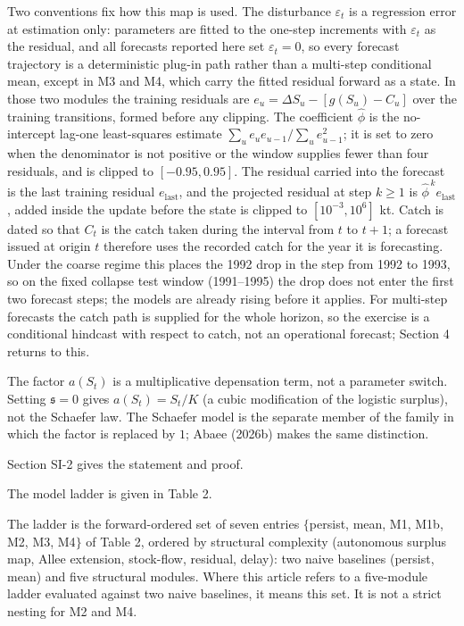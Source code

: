\documentclass[11pt]{article}
\begin{document}
Two conventions fix how this map is used. The disturbance
\(\varepsilon_t\) is a regression error at estimation only: parameters
are fitted to the one-step increments with \(\varepsilon_t\) as the
residual, and all forecasts reported here set \(\varepsilon_t = 0\), so
every forecast trajectory is a deterministic plug-in path rather than a
multi-step conditional mean, except in M3 and M4, which carry the
fitted residual forward as a state. In those two modules the training residuals are
\(e_u = \Delta S_u - [g(S_u) - C_u]\) over the training transitions,
formed before any clipping. The coefficient \(\hat\phi\) is the
no-intercept lag-one least-squares estimate
\(\sum_u e_u e_{u-1}/\sum_u e_{u-1}^2\); it is set to zero when the
denominator is not positive or the window supplies fewer than four
residuals, and is clipped to \([-0.95, 0.95]\). The residual carried
into the forecast is the last training residual \(e_{\mathrm{last}}\),
and the projected residual at step \(k \ge 1\) is
\(\hat\phi^{\,k} e_{\mathrm{last}}\), added inside the update before
the state is clipped to \([10^{-3}, 10^{6}]\) kt.
Catch is dated so that \(C_t\) is the catch taken during the interval
from \(t\) to \(t+1\); a forecast issued at origin \(t\) therefore
uses the recorded catch for the year it is forecasting. Under the
coarse regime this places the 1992 drop in the step from 1992 to 1993,
so on the fixed collapse test window (1991--1995) the drop does not
enter the first two forecast steps; the models are already rising before
it applies.
For multi-step forecasts the catch path is supplied for the
whole horizon, so the exercise is a conditional hindcast with respect to
catch, not an operational forecast; Section 4 returns to this.

The factor \(a(S_t)\) is a multiplicative depensation term, not a
parameter switch. Setting \(\mathfrak s=0\) gives \(a(S_t)=S_t/K\) (a
cubic modification of the logistic surplus), not the Schaefer law. The
Schaefer model is the separate member of the family in which the factor
is replaced by \(1\); Abaee (2026b) makes the same distinction.

Section SI-2 gives the statement and proof.

The model ladder is given in Table 2.

The ladder is the forward-ordered set of seven entries \(\{\)persist,
mean, M1, M1b, M2, M3, M4\(\}\) of Table 2, ordered by structural
complexity (autonomous surplus map, Allee extension, stock-flow,
residual, delay): two naive baselines (persist, mean) and five
structural modules. Where this article refers to a five-module ladder
evaluated against two naive baselines, it means this set. It is not a
strict nesting for M2 and M4.
\end{document}
